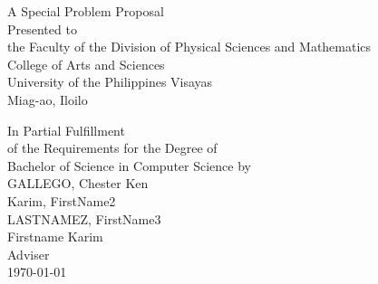 \begin{titlepage}
\centering


\vspace{1.75cm}
A Special Problem Proposal\\
Presented to\\
the Faculty of the Division of Physical Sciences and Mathematics\\
College of Arts and Sciences\\
University of the Philippines Visayas\\
Miag-ao, Iloilo

\vspace{1.75cm}
In Partial Fulfillment\\
of the Requirements for the Degree of\\
Bachelor of Science in Computer Science
\vspace{1.75cm}
by\\

\vspace{1cm}
GALLEGO, Chester Ken  \\
Karim, FirstName2  \\
LASTNAMEZ, FirstName3  \\

\vspace{1.75cm}
Firstname Karim \\
Adviser\\

\vspace{1.75cm}
\today
\end{titlepage}
